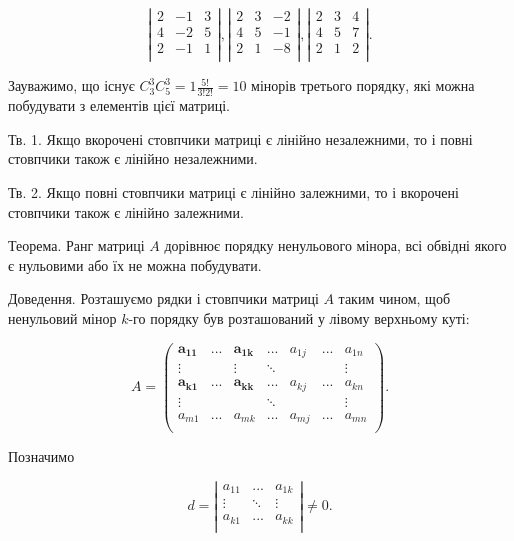 $$\left| \begin{matrix}
	2 & -1 & 3 \\
	4 & -2 & 5 \\
	2 & -1 & 1 \\
\end{matrix} \right|, \left| \begin{matrix}
	2 & 3 & -2 \\
	4 & 5 & -1 \\
	2 & 1 & -8 \\
\end{matrix} \right|, \left| \begin{matrix}
	2 & 3 & 4 \\
	4 & 5 & 7 \\
	2 & 1 & 2 \\
\end{matrix} \right|.$$


Зауважимо, що існує $C_3^3 C_5^3 = 1 \frac{5!}{3!2!} = 10$ мінорів третього порядку, які
можна побудувати з елементів цієї матриці.


Тв. 1. Якщо вкорочені стовпчики матриці є лінійно незалежними, то і повні
стовпчики також є лінійно незалежними. 


Тв. 2. Якщо повні стовпчики матриці є лінійно залежними, то і вкорочені
стовпчики також є лінійно залежними.


Теорема. Ранг матриці $A$ дорівнює порядку ненульового мінора, всі обвідні
якого є нульовими або їх не можна побудувати.


Доведення. Розташуємо рядки і стовпчики матриці $A$ таким чином, щоб
ненульовий мінор $k$-го порядку був розташований у лівому верхньому куті:

$$A = \begin{pmatrix}
	\mathbf{a_{11}} & ... & \mathbf{a_{1k}} & ...    & a_{1j} & ... & a_{1n} \\
	\vdots          &     & \vdots          & \ddots &        &     & \vdots \\
	\mathbf{a_{k1}} & ... & \mathbf{a_{kk}} & ...    & a_{kj} & ... & a_{kn} \\
	\vdots          &     &                 & \ddots &        &     & \vdots \\
	a_{m1}          & ... & a_{mk}          & ...    & a_{mj} & ... & a_{mn} \\
\end{pmatrix}.$$

Позначимо

$$d = \left| \begin{matrix}
	a_{11} & ...    & a_{1k} \\
	\vdots & \ddots & \vdots \\
	a_{k1} & ...    & a_{kk} \\
\end{matrix} \right| \neq 0.$$



